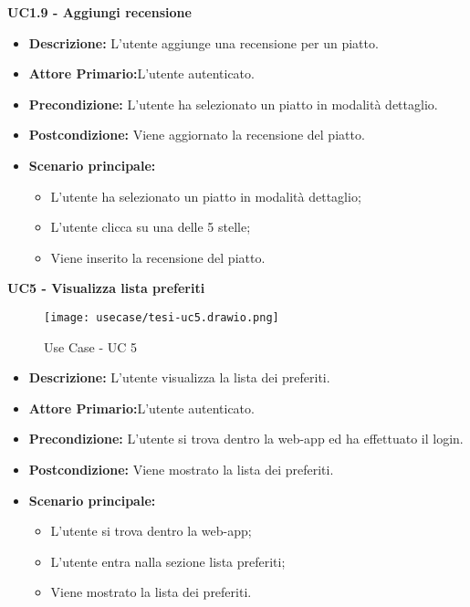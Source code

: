 \textbf{UC1.9 - Aggiungi recensione}
\begin{itemize}
    \item \textbf{Descrizione:} L'utente aggiunge una recensione per un piatto.
    \item \textbf{Attore Primario:}L'utente autenticato.
    \item \textbf{Precondizione:} L'utente ha selezionato un piatto in modalità dettaglio.
    \item \textbf{Postcondizione:} Viene aggiornato la recensione del piatto.
    \item \textbf{Scenario principale:}
    \begin{itemize}
        \item L'utente ha selezionato un piatto in modalità dettaglio;
        \item L'utente clicca su una delle 5 stelle;
        \item Viene inserito la recensione del piatto.
    \end{itemize}
\end{itemize}
\textbf{UC5 - Visualizza lista preferiti}
\begin{figure}[H]
    \centering
    \texttt{[image: usecase/tesi-uc5.drawio.png]}
    \caption{Use Case - UC 5}
\end{figure}
\begin{itemize}
    \item \textbf{Descrizione:} L'utente visualizza la lista dei preferiti.
    \item \textbf{Attore Primario:}L'utente autenticato.
    \item \textbf{Precondizione:} L'utente si trova dentro la web-app ed ha effettuato il login.
    \item \textbf{Postcondizione:} Viene mostrato la lista dei preferiti.
    \item \textbf{Scenario principale:}
    \begin{itemize}
        \item L'utente si trova dentro la web-app;
        \item L'utente entra nalla sezione lista preferiti;
        \item Viene mostrato la lista dei preferiti.
    \end{itemize}
\end{itemize}
